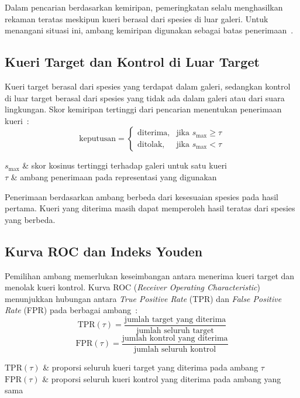 Dalam pencarian berdasarkan kemiripan, pemeringkatan selalu menghasilkan rekaman teratas meskipun kueri berasal dari spesies di luar galeri. Untuk menangani situasi ini, ambang kemiripan digunakan sebagai batas penerimaan~\cite{you2024openset}.

\subsection{Kueri Target dan Kontrol di Luar Target}

Kueri target berasal dari spesies yang terdapat dalam galeri, sedangkan kontrol di luar target berasal dari spesies yang tidak ada dalam galeri atau dari suara lingkungan. Skor kemiripan tertinggi dari pencarian menentukan penerimaan kueri~\cite{you2024openset}:
\begin{equation}\label{eq:acceptance}
\text{keputusan} =
\begin{cases}
\text{diterima}, & \text{jika } s_{\max} \geq \tau \\
\text{ditolak}, & \text{jika } s_{\max} < \tau
\end{cases}
\end{equation}
\begin{keteranganRumus}
$s_{\max}$ & skor kosinus tertinggi terhadap galeri untuk satu kueri \\
$\tau$ & ambang penerimaan pada representasi yang digunakan
\end{keteranganRumus}

Penerimaan berdasarkan ambang berbeda dari kesesuaian spesies pada hasil pertama. Kueri yang diterima masih dapat memperoleh hasil teratas dari spesies yang berbeda.

\subsection{Kurva ROC dan Indeks Youden}
\label{subsec:indeks-youden}

Pemilihan ambang memerlukan keseimbangan antara menerima kueri target dan menolak kueri kontrol. Kurva ROC (\textit{Receiver Operating Characteristic}) menunjukkan hubungan antara \textit{True Positive Rate} (TPR) dan \textit{False Positive Rate} (FPR) pada berbagai ambang~\cite{hassanzad2024youden}:
\begin{equation}\label{eq:tpr}
\mathrm{TPR}(\tau) = \frac{\text{jumlah target yang diterima}}{\text{jumlah seluruh target}}
\end{equation}
\begin{equation}\label{eq:fpr}
\mathrm{FPR}(\tau) = \frac{\text{jumlah kontrol yang diterima}}{\text{jumlah seluruh kontrol}}
\end{equation}
\begin{keteranganRumus}
$\mathrm{TPR}(\tau)$ & proporsi seluruh kueri target yang diterima pada ambang $\tau$ \\
$\mathrm{FPR}(\tau)$ & proporsi seluruh kueri kontrol yang diterima pada ambang yang sama
\end{keteranganRumus}

